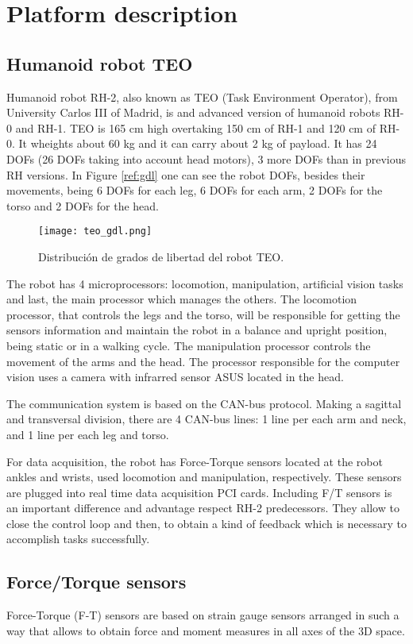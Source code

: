 
\chapter{Platform description} 
\label{cap:platform_description}
\section{Humanoid robot TEO}
Humanoid robot RH-2, also known as TEO (Task Environment Operator), from University Carlos III of Madrid, is and advanced version of humanoid robots RH-0 and RH-1. TEO is 165 cm high overtaking 150 cm of RH-1 and 120 cm of RH-0. It wheights about 60 kg and it can carry about 2 kg of payload. It has 24 DOFs (26 DOFs taking into account head motors), 3 more DOFs than in previous RH versions. In Figure \ref{ref:gdl} one can see the robot DOFs, besides their movements, being 6 DOFs for each leg, 6 DOFs for each arm, 2 DOFs for the torso and 2 DOFs for the head.

\begin{figure}[!hbt]
\centering
\texttt{[image: teo\_gdl.png]}
\caption{Distribución de grados de libertad del robot TEO.}
\label{fig:gdl}
\end{figure}

The robot has 4 microprocessors: locomotion, manipulation, artificial vision tasks and last, the main processor which manages the others. The locomotion processor, that controls the legs and the torso, will be responsible for getting the sensors information and maintain the robot in a balance and upright position, being static or in a walking cycle. The manipulation processor controls the movement of the arms and the head. The processor responsible for the computer vision uses a camera with infrarred sensor ASUS located in the head.

The communication system is based on the CAN-bus protocol. Making a sagittal and transversal division, there are 4 CAN-bus lines: 1 line per each arm and neck, and 1 line per each leg and torso.

For data acquisition, the robot has Force-Torque sensors located at the robot ankles and wrists, used locomotion and manipulation, respectively. These sensors are plugged into real time data acquisition PCI cards. Including F/T sensors is an important difference and advantage respect RH-2 predecessors. They allow to close the control loop and then, to obtain a kind of feedback which is necessary to accomplish tasks successfully.


\section{Force/Torque sensors}
Force-Torque (F-T) sensors are based on strain gauge sensors arranged in such a way that allows to obtain force and moment measures in all axes of the 3D space. 

